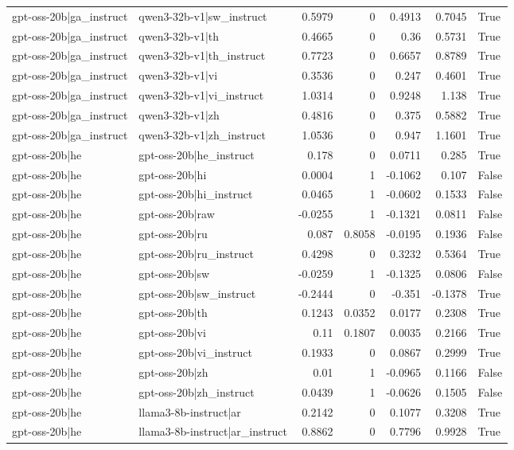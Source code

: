 \begin{table}
\begin{tabular}{l l r r r r l}
gpt-oss-20b|ga_instruct & qwen3-32b-v1|sw_instruct & 0.5979 & 0 & 0.4913 & 0.7045 & True \\
gpt-oss-20b|ga_instruct & qwen3-32b-v1|th & 0.4665 & 0 & 0.36 & 0.5731 & True \\
gpt-oss-20b|ga_instruct & qwen3-32b-v1|th_instruct & 0.7723 & 0 & 0.6657 & 0.8789 & True \\
gpt-oss-20b|ga_instruct & qwen3-32b-v1|vi & 0.3536 & 0 & 0.247 & 0.4601 & True \\
gpt-oss-20b|ga_instruct & qwen3-32b-v1|vi_instruct & 1.0314 & 0 & 0.9248 & 1.138 & True \\
gpt-oss-20b|ga_instruct & qwen3-32b-v1|zh & 0.4816 & 0 & 0.375 & 0.5882 & True \\
gpt-oss-20b|ga_instruct & qwen3-32b-v1|zh_instruct & 1.0536 & 0 & 0.947 & 1.1601 & True \\
gpt-oss-20b|he & gpt-oss-20b|he_instruct & 0.178 & 0 & 0.0711 & 0.285 & True \\
gpt-oss-20b|he & gpt-oss-20b|hi & 0.0004 & 1 & -0.1062 & 0.107 & False \\
gpt-oss-20b|he & gpt-oss-20b|hi_instruct & 0.0465 & 1 & -0.0602 & 0.1533 & False \\
gpt-oss-20b|he & gpt-oss-20b|raw & -0.0255 & 1 & -0.1321 & 0.0811 & False \\
gpt-oss-20b|he & gpt-oss-20b|ru & 0.087 & 0.8058 & -0.0195 & 0.1936 & False \\
gpt-oss-20b|he & gpt-oss-20b|ru_instruct & 0.4298 & 0 & 0.3232 & 0.5364 & True \\
gpt-oss-20b|he & gpt-oss-20b|sw & -0.0259 & 1 & -0.1325 & 0.0806 & False \\
gpt-oss-20b|he & gpt-oss-20b|sw_instruct & -0.2444 & 0 & -0.351 & -0.1378 & True \\
gpt-oss-20b|he & gpt-oss-20b|th & 0.1243 & 0.0352 & 0.0177 & 0.2308 & True \\
gpt-oss-20b|he & gpt-oss-20b|vi & 0.11 & 0.1807 & 0.0035 & 0.2166 & True \\
gpt-oss-20b|he & gpt-oss-20b|vi_instruct & 0.1933 & 0 & 0.0867 & 0.2999 & True \\
gpt-oss-20b|he & gpt-oss-20b|zh & 0.01 & 1 & -0.0965 & 0.1166 & False \\
gpt-oss-20b|he & gpt-oss-20b|zh_instruct & 0.0439 & 1 & -0.0626 & 0.1505 & False \\
gpt-oss-20b|he & llama3-8b-instruct|ar & 0.2142 & 0 & 0.1077 & 0.3208 & True \\
gpt-oss-20b|he & llama3-8b-instruct|ar_instruct & 0.8862 & 0 & 0.7796 & 0.9928 & True \\

\end{tabular}
\end{table}

